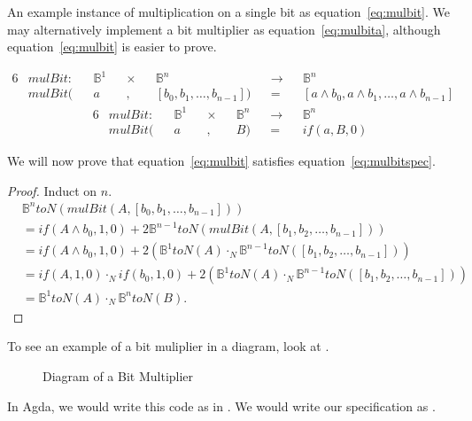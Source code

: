 \documentclass[14pt]{extarticle}  %
\begin{document}
An example instance of multiplication on a single bit as equation~\ref{eq:mulbit}. We may alternatively implement a bit multiplier as equation~\ref{eq:mulbita},
although equation~\ref{eq:mulbit} is easier to prove.

\begin{alignat}{6}\label{eq:mulbit}
  &mulBit : &&\mathbb{B}^{1} &&\times &&\mathbb{B}^{n} &&\to &&\mathbb{B}^{n}\\
  &mulBit(&&a &&, &&[b_{0}, b_{1},\ldots,b_{n-1}]) &&= &&[a \land b_{0}, a\land b_{1}, \ldots, a \land b_{n-1}]
\end{alignat}
\begin{alignat}{6}\label{eq:mulbita}
  &mulBit : &&\mathbb{B}^{1} &&\times &&\mathbb{B}^{n} &&\to &&\mathbb{B}^{n}\\
  &mulBit(&&a &&, &&B) &&= && if(a,B,0)
\end{alignat}



We will now prove that equation~\ref{eq:mulbit} satisfies equation~\ref{eq:mulbitspec}.
\begin{proof}
  Induct on $n$.
  \begin{align*}
    &\mathbb{B}^{n}toN(mulBit(A,[b_{0}, b_{1}, \ldots, b_{n-1}])) \\
    &= if(A \land b_{0}, 1, 0) + 2\mathbb{B}^{n-1}toN(mulBit(A, [b_{1}, b_{2}, \ldots, b_{n-1}])) \\
    &= if(A \land b_{0}, 1, 0) + 2(\mathbb{B}^{1}toN(A) \cdot_{N} \mathbb{B}^{n-1}toN([b_{1}, b_{2}, \ldots, b_{n-1}])) \\
    &= if(A,1,0)\cdot_{N} if(b_{0}, 1, 0) + 2(\mathbb{B}^{1}toN(A) \cdot_{N} \mathbb{B}^{n-1}toN([b_{1}, b_{2}, \ldots, b_{n-1}])) \\
    &= \mathbb{B}^{1}toN(A)\cdot_{N}\mathbb{B}^{n}toN(B).
\end{align*}
\end{proof}
To see an example of a bit muliplier in a diagram, look at .
 \begin{figure}[!h]
\centering
\caption{Diagram of a Bit Multiplier}
\label{fig:bitmul}
\end{figure}
In Agda, we would write this code as in . We would write our specification as
.
\end{document}
